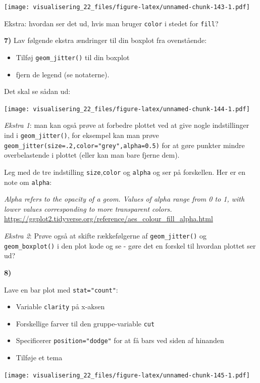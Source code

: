 \documentclass[
]{book}
\providecommand{\tightlist}{%
  \setlength{\itemsep}{0pt}\setlength{\parskip}{0pt}}
\begin{document}
\texttt{[image: visualisering\_22\_files/figure-latex/unnamed-chunk-143-1.pdf]}

Ekstra: hvordan ser det ud, hvis man bruger \texttt{color} i stedet for \texttt{fill}?

\textbf{7)} Lav følgende ekstra ændringer til din boxplot fra ovenstående:

\begin{itemize}
\tightlist
\item
  Tilføj \texttt{geom\_jitter()} til din boxplot
\item
  fjern de legend (se notaterne).
\end{itemize}

Det skal se sådan ud:

\texttt{[image: visualisering\_22\_files/figure-latex/unnamed-chunk-144-1.pdf]}

\emph{Ekstra 1}: man kan også prøve at forbedre plottet ved at give nogle indstillinger ind i \texttt{geom\_jitter()}, for eksempel kan man prøve \texttt{geom\_jitter(size=.2,color="grey",alpha=0.5)} for at gøre punkter mindre overbelastende i plottet (eller kan man bare fjerne dem).

Leg med de tre indstilling \texttt{size},\texttt{color} og \texttt{alpha} og ser på forskellen. Her er en note om \texttt{alpha}:

\emph{Alpha refers to the opacity of a geom. Values of alpha range from 0 to 1, with lower values corresponding to more transparent colors.} \url{https://ggplot2.tidyverse.org/reference/aes_colour_fill_alpha.html}

\emph{Ekstra 2}: Prøve også at skifte rækkefølgerne af \texttt{geom\_jitter()} og \texttt{geom\_boxplot()} i den plot kode og se - gøre det en forskel til hvordan plottet ser ud?

\textbf{8)}

Lave en bar plot med \texttt{stat="count"}:

\begin{itemize}
\tightlist
\item
  Variable \texttt{clarity} på x-aksen
\item
  Forskellige farver til den gruppe-variable \texttt{cut}
\item
  Specificerer \texttt{position="dodge"} for at få bars ved siden af hinanden
\item
  Tilføje et tema
\end{itemize}

\texttt{[image: visualisering\_22\_files/figure-latex/unnamed-chunk-145-1.pdf]}
\end{document}
